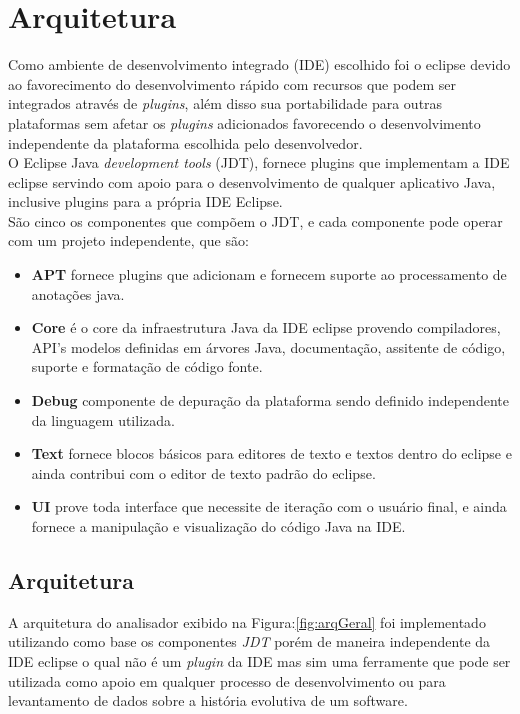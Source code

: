 \chapter {Arquitetura}

Como ambiente de desenvolvimento integrado (IDE) escolhido foi o eclipse devido ao favorecimento do desenvolvimento rápido com recursos que podem ser integrados através de {\it plugins}, além disso sua portabilidade para outras plataformas sem afetar os {\it plugins} adicionados favorecendo o desenvolvimento independente da plataforma escolhida pelo desenvolvedor.\\

O Eclipse Java {\it development tools} (JDT), fornece plugins que implementam a IDE eclipse servindo com apoio para o desenvolvimento de qualquer aplicativo Java, inclusive plugins para a própria IDE Eclipse.\\

São cinco os componentes que compõem o JDT, e cada componente pode operar com um projeto independente, que são:

	\begin{itemize}
		\item \textbf{APT} fornece plugins que adicionam e fornecem suporte ao processamento de anotações java.
		\item \textbf{Core} é o core da infraestrutura Java da IDE eclipse provendo compiladores, API's modelos definidas em árvores Java, documentação, assitente de código, suporte e formatação de código fonte.
		\item \textbf{Debug} componente de depuração da plataforma sendo definido independente da linguagem utilizada.
		\item \textbf{Text} fornece blocos básicos para editores de texto e textos dentro do eclipse e ainda contribui com o editor de texto padrão do eclipse. \item \textbf{UI} prove toda interface que necessite de iteração com o usuário final, e ainda fornece a manipulação e visualização do código Java na IDE.
	\end{itemize} 
	

\clearpage
	
\section {Arquitetura}

A arquitetura do analisador exibido na Figura:\ref{fig:arqGeral} foi  implementado utilizando como base os componentes \textit{JDT} porém de maneira independente da IDE eclipse o qual não é um {\it plugin} da IDE mas sim uma ferramente que pode ser utilizada como apoio em qualquer processo de desenvolvimento ou para levantamento de dados sobre a história evolutiva de um software.\\

